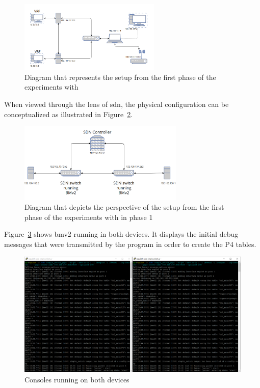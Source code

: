 \begin{figure}
	\centering
	\includegraphics[width=0.6\textwidth]{Chapters/Figures/tests/bmv2_phase_1/setup_diagram.PNG}
	\caption{Diagram that represents the setup from the first phase of the experiments with }
	\label{fig:exp2_phase1_diagram}
\end{figure}

When viewed through the lens of \gls{sdn}, the physical configuration can be conceptualized as illustrated in Figure~\ref{fig:exp2_phase1_sdn_diagram}.

\begin{figure}
	\centering
	\includegraphics[width=0.7\textwidth]{Chapters/Figures/tests/bmv2_phase_1/sdn_diagram.PNG}
	\caption{Diagram that depicts the  perspective of the setup from the first phase of the experiments with  in phase 1}
	\label{fig:exp2_phase1_sdn_diagram}
\end{figure}


Figure~\ref{fig:exp2_phase1_bmv2} shows \gls{bmv2} running in both devices. It displays the initial debug messages that were transmitted by the program in order to create the P4 tables.

\begin{figure}
	\centering
	\includegraphics[width=\textwidth]{Chapters/Figures/tests/bmv2_phase_1/bmv2_running.PNG}
	\caption{Consoles running  on both devices}
	\label{fig:exp2_phase1_bmv2}
\end{figure}

